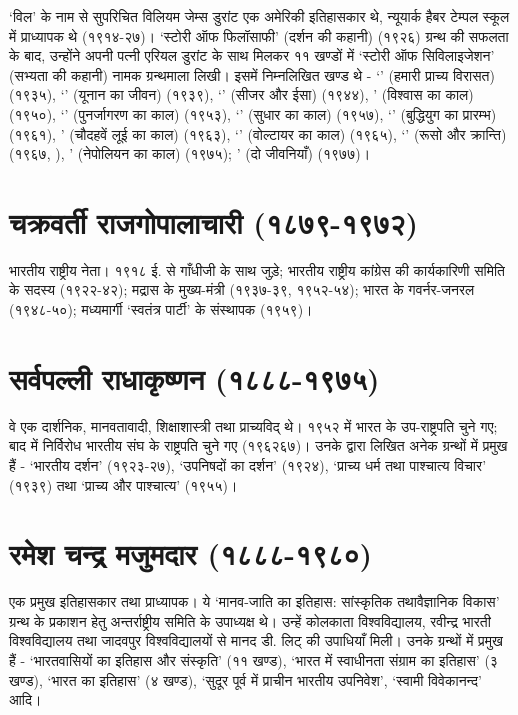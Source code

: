 ‘विल’ के नाम से सुपरिचित विलियम जेम्स डुरांट एक अमेरिकी इतिहासकार थे, न्यूयार्क हैबर टेम्पल स्कूल में प्राध्यापक थे (१९१४-२७)। ‘स्टोरी ऑफ फिलॉसाफी’ (दर्शन की कहानी) (१९२६) ग्रन्थ की सफलता के बाद, उन्होंने अपनी पत्नी एरियल डुरांट के साथ मिलकर ११ खण्डों में ‘स्टोरी ऑफ सिविलाइजेशन’ (सभ्यता की कहानी) नामक ग्रन्थमाला लिखी। इसमें निम्नलिखित खण्ड थे - ‘’ (हमारी प्राच्य विरासत) (१९३५), ‘’ (यूनान का जीवन) (१९३९), ‘’ (सीजर और ईसा) (१९४४), ’ (विश्वास का काल) (१९५०), ‘’ (पुनर्जागरण का काल) (१९५३), ‘’ (सुधार का काल) (१९५७), ‘’ (बुद्धियुग का प्रारम्भ) (१९६१), ’ (चौदहवें लूई का काल) (१९६३), ‘’ (वोल्टायर का काल) (१९६५), ‘’ (रूसो और क्रान्ति) (१९६७, ), ’ (नेपोलियन का काल) (१९७५); ’ (दो जीवनियाँ) (१९७७)।

\section*{चक्रवर्ती राजगोपालाचारी (१८७९-१९७२) }

भारतीय राष्ट्रीय नेता। १९१८ ई. से गाँधीजी के साथ जुड़े; भारतीय राष्ट्रीय कांग्रेस की कार्यकारिणी समिति के सदस्य (१९२२-४२); मद्रास के मुख्य-मंत्री (१९३७-३९, १९५२-५४); भारत के गवर्नर-जनरल (१९४८-५०); मध्यमार्गी ‘स्वतंत्र पार्टी’ के संस्थापक (१९५९)। 

\section*{सर्वपल्ली राधाकृष्णन (१८८८-१९७५) }

वे एक दार्शनिक, मानवतावादी, शिक्षाशास्त्री तथा प्राच्यविद् थे। १९५२ में भारत के उप-राष्ट्रपति चुने गए; बाद में निर्विरोध भारतीय संघ के राष्ट्रपति चुने गए (१९६२६७)। उनके द्वारा लिखित अनेक ग्रन्थों में प्रमुख हैं - ‘भारतीय दर्शन’ (१९२३-२७), ‘उपनिषदों का दर्शन’ (१९२४), ‘प्राच्य धर्म तथा पाश्चात्य विचार’ (१९३९) तथा ‘प्राच्य और पाश्चात्य’ (१९५५)। 

\section*{रमेश चन्द्र मजुमदार (१८८८-१९८०) }

एक प्रमुख इतिहासकार तथा प्राध्यापक। ये ‘मानव-जाति का इतिहास: सांस्कृतिक तथा\break वैज्ञानिक विकास’ ग्रन्थ के प्रकाशन हेतु अन्तर्राष्ट्रीय समिति के उपाध्यक्ष थे। उन्हें कोलकाता विश्व\-विद्यालय, रवीन्द्र भारती विश्वविद्यालय तथा जादवपुर विश्वविद्यालयों से मानद डी. लिट् की उपाधियाँ मिली। उनके ग्रन्थों में प्रमुख हैं - ‘भारतवासियों का इतिहास और संस्कृति’ (११ खण्ड), ‘भारत में स्वाधीनता संग्राम का इतिहास’ (३ खण्ड), ‘भारत का इतिहास’ (४ खण्ड), ‘सुदूर पूर्व में प्राचीन भारतीय उपनिवेश’, ‘स्वामी विवेकानन्द’ आदि। 

